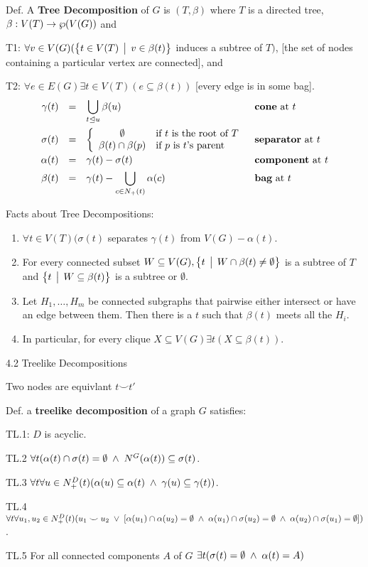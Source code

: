 \documentclass[12pt]{article}
\begin{document}
Def.  A {\bf Tree Decomposition} of $G$ is $(T,\beta)$ where $T$ is a directed tree,  $\beta: V(T) \rightarrow
\wp(V(G))$ and

T1: $\forall v\in V(G) ( \bigl\{ t \in V(T) \,\bigm|\, v \in \beta(t) \bigr\}$ induces a subtree of $T)$,
 [the set of nodes containing a particular vertex are connected], and 

T2: $\forall e\in E(G)\exists t \in V(T) ( e\subseteq \beta(t))$ [every edge is in some bag].
\[
\begin{array}{rcll}
\gamma(t) &=& {\displaystyle \bigcup_{t \unlhd u} \beta(u)} &  \mbox{{\bf cone} at }t\\[3.5ex]
\sigma(t) &=& \left\{\begin{array}{cl}
               \emptyset & \mbox{if $t$ is the root of $T$}\\
               \beta(t) \cap \beta(p)& \mbox{if $p$ is $t$'s parent}
               \end{array}\right.  &  \mbox{{\bf separator} at }t\\[2ex]
\alpha(t) &=& \gamma(t) - \sigma(t) & \mbox{{\bf component} at }t\\[1ex]
\beta(t) &=& \gamma(t) -  {\displaystyle \bigcup_{c \in N_+(t)} \alpha(c) }&  \mbox{{\bf bag} at }t
\end{array}\]

Facts about Tree Decompositions:

\begin{enumerate}
\item $\forall t \in V(T) (\sigma(t)$ separates $\gamma(t)$ from $V(G) - \alpha(t)$.
\item For every connected subset $W \subseteq V(G), \bigl\{ t \,\bigm|\, W \cap \beta(t) \ne \emptyset \bigr\}$ is a
  subtree of $T$ and $\bigl\{ t \,\bigm|\, W\subseteq \beta(t) \bigr\}$ is a subtree or $\emptyset$.
\item Let $H_1, \ldots, H_m$ be connected subgraphs that pairwise either intersect or have an edge
  between them.  Then there is a $t$ such that $\beta(t)$ meets all the $H_i$.
\item In particular, for every clique $X\subseteq V(G) \exists t ( X \subseteq \beta(t))$.
\end{enumerate}

4.2 Treelike Decompositions

Two nodes are equivlant $t \smile t'$

Def. a {\bf treelike decomposition} of a graph $G$ satisfies:

TL.1:  $D$ is acyclic.

TL.2  $\forall t ( \alpha(t) \cap \sigma(t) = \emptyset \;\land\; N^G(\alpha(t)) \subseteq
\sigma(t)$.

TL.3 $\forall t \forall u \in N^D_{+}(t) (\alpha(u) \subseteq \alpha(t) \;\land\; \gamma(u) \subseteq
\gamma(t))$. 

TL.4 $\forall t \forall u_1,u_2 \in N^D_{+}(t) (u_1 \smile u_2 \;\lor\; [\alpha(u_1) \cap \alpha(u_2) =
\emptyset \;\land\; \alpha(u_1) \cap \sigma(u_2) = \emptyset \;\land\; \alpha(u_2) \cap \sigma(u_1) =
\emptyset])$. 

TL.5 For all connected components $A$ of $G$ $\exists t ( \sigma(t) = \emptyset \;\land\; \alpha(t) = A)$
\end{document}
